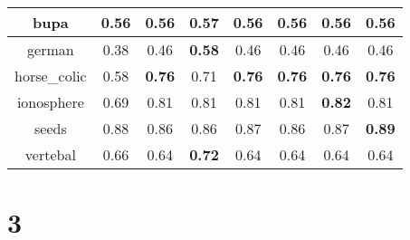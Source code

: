 \documentclass{article}%
\begin{document}
\begin{tabular}{c|ccccccc}
\hline%
bupa&0.56&0.56&\textbf{0.57}&0.56&0.56&0.56&0.56\\%
\hline%
german&0.38&0.46&\textbf{0.58}&0.46&0.46&0.46&0.46\\%
\hline%
horse\_colic&0.58&\textbf{0.76}&0.71&\textbf{0.76}&\textbf{0.76}&\textbf{0.76}&\textbf{0.76}\\%
\hline%
ionosphere&0.69&0.81&0.81&0.81&0.81&\textbf{0.82}&0.81\\%
\hline%
seeds&0.88&0.86&0.86&0.87&0.86&0.87&\textbf{0.89}\\%
\hline%
vertebal&0.66&0.64&\textbf{0.72}&0.64&0.64&0.64&0.64\\%
\hline%
\end{tabular}

%
\section*{3}%
\end{document}
